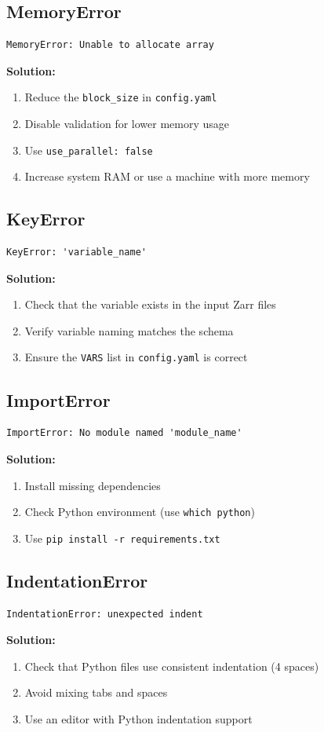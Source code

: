 ﻿\documentclass[12pt,a4paper]{report}
\begin{document}
\subsection{MemoryError}
\begin{lstlisting}[caption=MemoryError]
MemoryError: Unable to allocate array
\end{lstlisting}
\textbf{Solution:}
\begin{enumerate}
    \item Reduce the \texttt{block\_size} in \texttt{config.yaml}
    \item Disable validation for lower memory usage
    \item Use \texttt{use\_parallel: false}
    \item Increase system RAM or use a machine with more memory
\end{enumerate}

\subsection{KeyError}
\begin{lstlisting}[caption=KeyError]
KeyError: 'variable_name'
\end{lstlisting}
\textbf{Solution:}
\begin{enumerate}
    \item Check that the variable exists in the input Zarr files
    \item Verify variable naming matches the schema
    \item Ensure the \texttt{VARS} list in \texttt{config.yaml} is correct
\end{enumerate}

\subsection{ImportError}
\begin{lstlisting}[caption=ImportError]
ImportError: No module named 'module_name'
\end{lstlisting}
\textbf{Solution:}
\begin{enumerate}
    \item Install missing dependencies
    \item Check Python environment (use \texttt{which python})
    \item Use \texttt{pip install -r requirements.txt}
\end{enumerate}

\subsection{IndentationError}
\begin{lstlisting}[caption=IndentationError]
IndentationError: unexpected indent
\end{lstlisting}
\textbf{Solution:}
\begin{enumerate}
    \item Check that Python files use consistent indentation (4 spaces)
    \item Avoid mixing tabs and spaces
    \item Use an editor with Python indentation support
\end{enumerate}
\end{document}
